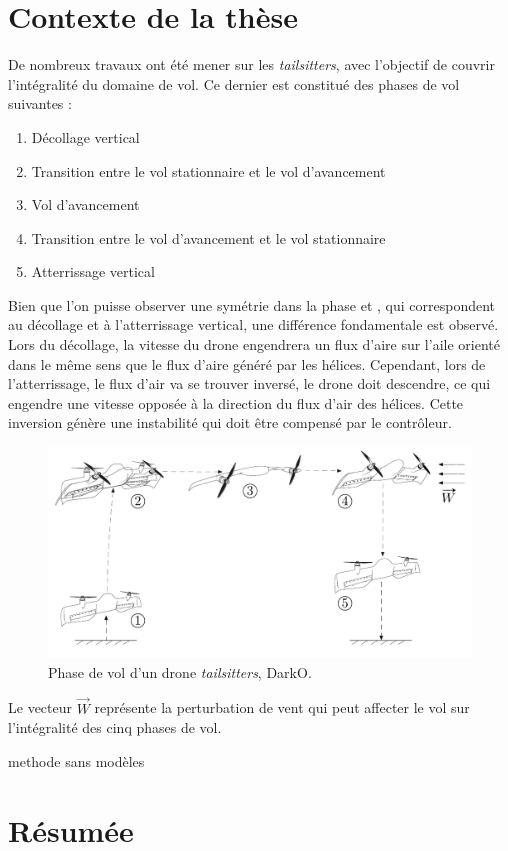 \section{Contexte de la thèse}
De nombreux travaux ont été mener sur les \textit{tailsitters}, avec l'objectif de couvrir l'intégralité du domaine de vol. Ce dernier est constitué des phases de vol suivantes :
\begin{enumerate}
    \item Décollage vertical
    \item Transition entre le vol stationnaire et le vol d'avancement
    \item Vol d'avancement
    \item Transition entre le vol d'avancement et le vol stationnaire
    \item Atterrissage vertical
\end{enumerate}
Bien que l'on puisse observer une symétrie dans la phase  et , qui correspondent au décollage et à l'atterrissage vertical, une différence fondamentale est observé. Lors du décollage, la vitesse du drone engendrera un flux d'aire sur l'aile orienté dans le même sens que le flux d'aire généré par les hélices. Cependant, lors de l'atterrissage, le flux d'air va se trouver inversé, le drone doit descendre, ce qui engendre une vitesse opposée à la direction du flux d'air des hélices. Cette inversion génère une instabilité qui doit être compensé par le contrôleur.

\begin{figure}[ht]
    \centering
        \includegraphics[width=0.8\columnwidth]{figures/darko_transition.png}
        \caption{Phase de vol d'un drone \textit{tailsitters}, DarkO.}
        \label{fig:darko_flight}
\end{figure}
Le vecteur $\overrightarrow{W}$ représente la perturbation de vent qui peut affecter le vol sur l'intégralité des cinq phases de vol.

methode sans modèles 






\section{Résumée}